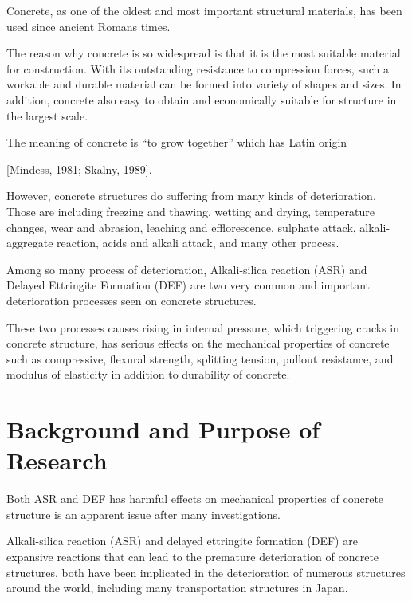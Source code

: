 

Concrete, as one of the oldest and most important structural materials, has been used since ancient Romans times.

The reason why concrete is so widespread is that it is the most suitable material for construction. With its outstanding resistance to compression forces, such a workable and durable material can be formed into variety of shapes and sizes. In addition, concrete also easy to obtain and economically suitable for structure in the largest scale.

The meaning of concrete is “to grow together” which has Latin origin

[Mindess, 1981; Skalny, 1989].

However, concrete structures do suffering from many kinds of deterioration. Those are including freezing and thawing, wetting and drying, temperature changes, wear and abrasion, leaching and efflorescence, sulphate attack, alkali-aggregate reaction, acids and alkali attack, and many other process.

Among so many process of deterioration, Alkali-silica reaction (ASR) and Delayed Ettringite Formation (DEF) are two very common and important deterioration processes seen on concrete structures.

These two processes causes rising in internal pressure, which triggering cracks in concrete structure, has serious effects on the mechanical properties of concrete such as compressive, flexural strength, splitting tension, pullout resistance, and modulus of elasticity in addition to durability of concrete.

\section{Background and Purpose of Research}

Both ASR and DEF has harmful effects on mechanical properties of concrete structure is an apparent issue after many investigations.

Alkali-silica reaction (ASR) and delayed ettringite formation (DEF) are expansive reactions that can lead to the premature deterioration of concrete structures, both have been implicated in the deterioration of numerous structures around the world, including many transportation structures in Japan.

